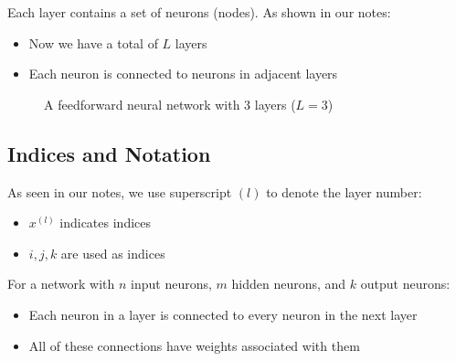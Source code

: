 Each layer contains a set of neurons (nodes). As shown in our notes:
\begin{itemize}
    \item Now we have a total of $L$ layers
    \item Each neuron is connected to neurons in adjacent layers
\end{itemize}

\begin{figure}[h]
\centering
{}
\caption{A feedforward neural network with 3 layers ($L=3$)}
\end{figure}

\subsection{Indices and Notation}
As seen in our notes, we use superscript $(l)$ to denote the layer number:
\begin{itemize}
    \item $x^{(l)}$ indicates indices
    \item $i, j, k$ are used as indices
\end{itemize}

For a network with $n$ input neurons, $m$ hidden neurons, and $k$ output neurons:
\begin{itemize}
    \item Each neuron in a layer is connected to every neuron in the next layer
    \item All of these connections have weights associated with them
\end{itemize}

